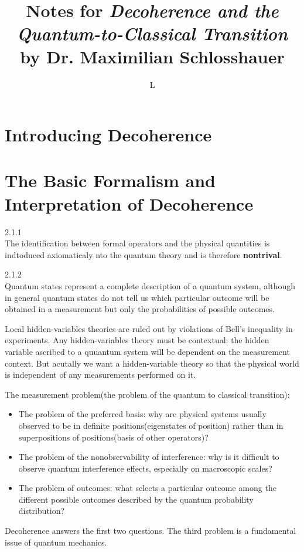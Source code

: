 \documentclass{article}
\title{Notes for \textsl{Decoherence and the
Quantum-to-Classical Transition} by Dr. Maximilian Schlosshauer}
\author{L}
\begin{document}
\maketitle
\section{Introducing Decoherence}

\section{The Basic Formalism and Interpretation of Decoherence}
2.1.1\\ The identification between formal operators and the physical quantities is 
indtoduced axiomaticaly nto the quantum theory and is therefore \textbf{nontrival}.

2.1.2\\ Quantum states represent a complete description of a quantum system, although
in general quantum states do not tell us which particular outcome will be obtained
in a measurement but only the probabilities of possible outcomes.

Local hidden-variables theories are ruled out by violations of Bell's inequality
in experiments. Any hidden-variables theory must be contextual: the hidden variable
ascribed to a quuantum system will be dependent on the measurement context. But 
acutally we want a hidden-variable theory so that the physical world is independent
of any measurements performed on it.

The measurement problem(the problem of the quantum to classical transition):
\begin{itemize}
    \item The problem of the preferred basis: why are physical systems usually 
    observed to be in definite positions(eigenstates of position) rather than
    in superpositions of positions(basis of other operators)?
    \item The problem of the nonobservability of interference: why is it 
    difficult to observe quantum interference effects, especially on macroscopic
    scales?
    \item The problem of outcomes: what selects a particular outcome among the
    different possible outcomes described by the quantum probability distribution?
\end{itemize}
Decoherence answers the first two questions. The third problem is a fundamental
issue of quantum mechanics.
\end{document}
